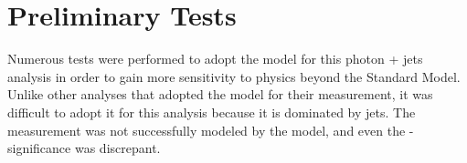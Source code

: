 %
%
%
%
%
%
%
%

\section{Preliminary Tests}
Numerous tests were performed to adopt the \met model for this photon + jets analysis in order to gain more sensitivity to physics beyond the Standard Model. Unlike other analyses that adopted the \met model for their \met measurement, it was difficult to adopt it for this analysis because it is dominated by jets. The \met measurement was not successfully modeled by the \met model, and even the \met-significance was discrepant.

